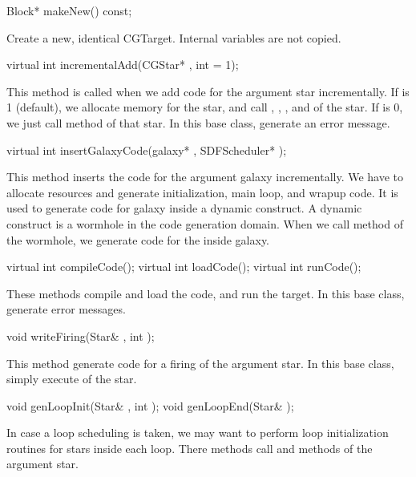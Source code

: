 \begin{example}
Block* makeNew() const;
\end{example}

Create a new, identical CGTarget. Internal variables are not copied.

\begin{example}
virtual int incrementalAdd(CGStar* , int  = 1);
\end{example}

This method is called when we add code for the argument star 
incrementally. If  is 1 (default), we allocate memory for the star, 
and call , , , and  of
the star. If  is 0, we just call  method of that star.
In this base class, generate an error
message.

\begin{example}
virtual int insertGalaxyCode(galaxy* , SDFScheduler* );
\end{example}

This method inserts the code for the argument galaxy  incrementally.
We have to allocate resources and generate initialization, main loop, and
wrapup code. It is used to generate code for galaxy inside a dynamic
construct. A dynamic construct is a wormhole in the code generation domain.
When we call  method of the wormhole, we generate code
for the inside galaxy. 

\begin{example}
virtual int compileCode();
virtual int loadCode();
virtual int runCode();
\end{example}

These methods compile and load the code, and run the target. In this base
class, generate error messages.

\begin{example}
void writeFiring(Star& , int );
\end{example}

This method generate code for a firing of the argument star. In this base
class, simply execute  of the star.

\begin{example}
void genLoopInit(Star& , int );
void genLoopEnd(Star& );
\end{example}

In case a loop scheduling is taken, we may want to perform loop
initialization routines for stars inside each loop. There methods
call  and  methods of the argument
star.


